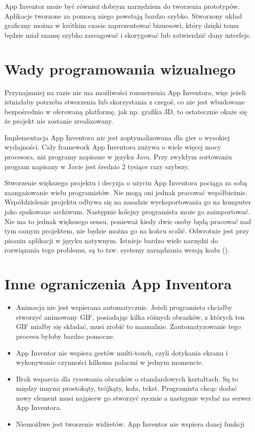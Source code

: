 App Inventor może być również dobrym narzędziem do tworzenia prototypów. Aplikacje tworzone za pomocą niego powstają bardzo szybko. Stworzony układ graficzny można w krótkim czasie zaprezentować biznesowi, który dzięki temu będzie miał szansę szybko zareagować i skorygować lub zatwierdzić dany interfejs.

\section{Wady programowania wizualnego}

Przynajmniej na razie nie ma możliwości rozszerzenia App Inventora, więc jeżeli istniałaby potrzeba stworzenia lub skorzystania z czegoś, co nie jest wbudowane bezpośrednio w oferowaną platformę, jak np. grafika 3D, to ostatecznie okaże się że projekt nie zostanie zrealizowany.

Implementacja App Inventora nie jest zoptymalizowana dla gier o wysokiej wydajności. Cały framework App Inventora zużywa o wiele więcej mocy procesora, niż programy napisane w języku Java. Przy zwykłym sortowaniu program napisany w Javie jest średnio 2 tysiące razy szybszy.

Stworzenie większego projektu i decyzja o użyciu App Inventora pociąga za sobą zaangażowanie wielu programistów. Nie mogą oni jednak pracować współbieżnie. Współdzielenie projektu odbywa się na zasadzie wyeksportowania go na komputer jako spakowane archiwum. Następnie kolejny programista może go zaimportować. Nie ma to jednak większego sensu, ponieważ kiedy dwie osoby będą pracować nad tym samym projektem, nie będzie można go na końcu scalić. Odwrotnie jest przy pisaniu aplikacji w języku natywnym. Istnieje bardzo wiele narzędzi do rozwiązania tego problemu, są to tzw. systemy zarządzania wersją kodu ().

\section{Inne ograniczenia App Inventora}

\begin{itemize}
\item Animacja nie jest wspierana automatycznie. Jeżeli programista chciałby stworzyć animowany GIF, posiadając kilka różnych obrazków, z których ten GIF miałby się składać, musi zrobić to manualnie. Zautomatyzowanie tego procesu byłoby bardzo pomocne.\cite{android:57}
\item App Inventor nie wspiera gestów multi-touch, czyli dotykania ekranu i wykonywanie czynności kilkoma palacmi w jednym momencie.\cite{android:57}
\item Brak wsparcia dla rysowania obrazków o standardowych kształtach. Są to między innymi prostokąty, trójkąty, koła, tekst. Programista chcąc dodać nowy element musi najpierw go stworzyć ręcznie a następnie wysłać na serwer App Inventora.\cite{android:57}
\item Niemożliwe jest tworzenie widżetów. App Inventor nie wspiera danej funkcji
\end{itemize}


